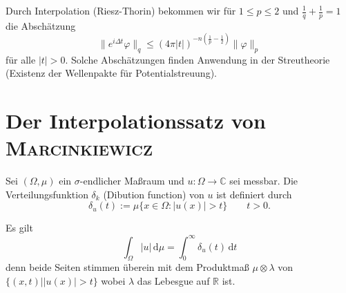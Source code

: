 \documentclass[
paper=a4,
bibtotocnumbered,
liststotocnumbered,
tablecaptionabove,
pointlessnumbers,
twoside,
openright,
10pt
]
{report}
\let\phi\varphi
\theoremstyle{definition}
\numberwithin{equation}{chapter}
\begin{document}
Durch Interpolation (Riesz-Thorin) bekommen wir für $1\le p \le 2$ und $\frac{1}{q}+\frac{1}{p} =1$ die Abschätzung
\begin{equation}
\| e^{i\Delta t}\phi\|_q \le (4\pi |t|)^{-n(\frac{1}{p} - \frac{1}{2})}\| \phi\|_p
\end{equation}
für alle $|t|>0$. Solche Abschätzungen finden Anwendung in der Streutheorie (Existenz der Wellenpakte für Potentialstreuung).

\section{Der Interpolationssatz von \textsc{Marcinkiewicz}}

Sei $(\Omega, \mu)$ ein $\sigma$-endlicher Maßraum und $u: \Omega \to \mathbb C$ sei messbar.  Die Verteilungsfunktion $\delta_k$ (Dibution function) von $u$ ist definiert durch
\begin{equation}
\delta_u(t) := \mu\{ x\in \Omega:|u(x)|>t\}\qquad t>0.
\end{equation}

Es gilt
\begin{equation}\label{eq:4.1}
\int_{\Omega} | u| \, \mathrm d\mu = \int_0^\infty \delta_u(t) \, \mathrm dt
\end{equation}
denn beide Seiten stimmen überein mit dem Produktmaß $\mu \otimes \lambda$ von $\{(x,t) | |u(x)|>t\}$ wobei $\lambda$ das Lebesgue auf $\mathbb R$ ist.
\end{document}
